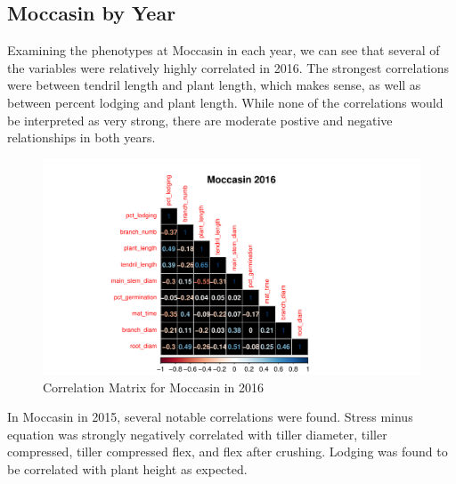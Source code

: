 \documentclass[11pt]{article}\usepackage[]{graphicx}\usepackage[]{color}
\makeatletter
\def\maxwidth{ %
  \ifdim\Gin@nat@width>\linewidth
    \linewidth
  \else
    \Gin@nat@width
  \fi
}
\newenvironment{knitrout}{}{} %
\makeatother
\begin{document}
\subsection{Moccasin by Year}
Examining the phenotypes at Moccasin in each year, we can see that several of the variables were relatively highly correlated in 2016. The strongest correlations were between tendril length and plant length, which makes sense, as well as between percent lodging and plant length. While none of the correlations would be interpreted as very strong, there are moderate postive and negative relationships in both years. 



\begin{knitrout}\footnotesize
{}\color{fgcolor}\begin{figure}[H]

{\centering \includegraphics[width=\maxwidth]{figure/moc-1} 

}

\caption[Correlation Matrix for Moccasin in 2016]{Correlation Matrix for Moccasin in 2016}\label{fig:moc}
\end{figure}


\end{knitrout}
\pagebreak
In Moccasin in 2015, several notable correlations were found. Stress minus equation was strongly negatively correlated with tiller diameter, tiller compressed, tiller compressed flex, and flex after crushing. Lodging was found to be correlated with plant height as expected. 
\end{document}
